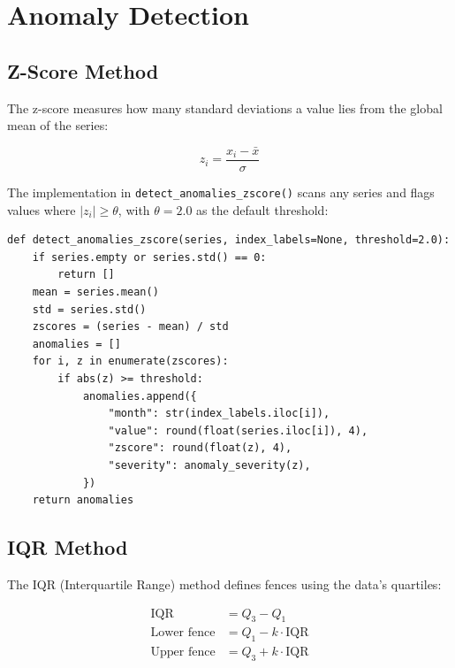 \section{Anomaly Detection}
\label{sec:kpi-anomaly}


\subsection{Z-Score Method}

The z-score measures how many standard deviations a value lies from the global mean of the series:

\begin{equation}
  z_i = \frac{x_i - \bar{x}}{\sigma}
\end{equation}

The implementation in \texttt{detect\_anomalies\_zscore()} scans any series and flags values where $|z_i| \geq \theta$, with $\theta = 2.0$ as the default threshold:

\begin{lstlisting}[style=python, caption={Z-score detection in analytics\_engine.py.}]
def detect_anomalies_zscore(series, index_labels=None, threshold=2.0):
    if series.empty or series.std() == 0:
        return []
    mean = series.mean()
    std = series.std()
    zscores = (series - mean) / std
    anomalies = []
    for i, z in enumerate(zscores):
        if abs(z) >= threshold:
            anomalies.append({
                "month": str(index_labels.iloc[i]),
                "value": round(float(series.iloc[i]), 4),
                "zscore": round(float(z), 4),
                "severity": anomaly_severity(z),
            })
    return anomalies
\end{lstlisting}

\subsection{IQR Method}

The IQR (Interquartile Range) method defines fences using the data's quartiles:

\begin{align}
  \text{IQR} &= Q_3 - Q_1 \\
  \text{Lower fence} &= Q_1 - k \cdot \text{IQR} \\
  \text{Upper fence} &= Q_3 + k \cdot \text{IQR}
\end{align}


